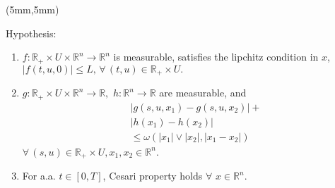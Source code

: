 \begin{frame}[plain]
    \begin{textblock*}{60mm}(5mm,5mm)
        \begin{graybox}{Hypothesis:}
            \begin{enumerate}[(\textbf{{C}}-1)]
                \item<1->
                    $
                        f:\mathbb{R}_{+}\times U
                        \times \mathbb{R}^n\rightarrow 
                        \mathbb{R}^n
                    $ is measurable, satisfies the lipchitz
                    condition in $x$,
                    $
                        |f(t,u,0)|\leq L,\,
                    \forall\,(t,u)\in
                    \mathbb{R}_{+}\times U .
                    $
                \item<2->
                   $
                        g:\mathbb{R}_{+}\times U\times 
                        \mathbb{R}^n\rightarrow \mathbb{R},
                   $ 
                   $
                        h:\mathbb{R}^n\rightarrow \mathbb{R}
                   $ are measurable, and
                   \begin{align*}
                        &|g(s,u,x_1)-g(s,u,x_2)|+\\
                        &|h(x_1)-h(x_2)|\\
                        &\leq \omega(|x_1|\vee |x_2|,|x_1-x_2|)
                    \end{align*}
                    $
                        \forall\, (s,u)\in \mathbb{R}_{+}
                        \times U,x_1,x_2\in \mathbb{R}^n
                    $.
                \item<3->
                    For a.a. $t\in[0,T]$, 
                    Cesari property holds $\forall$ $x\in 
                    \mathbb{R}^n$.
                \end{enumerate}	
        \end{graybox}
    \end{textblock*}
\end{frame}

